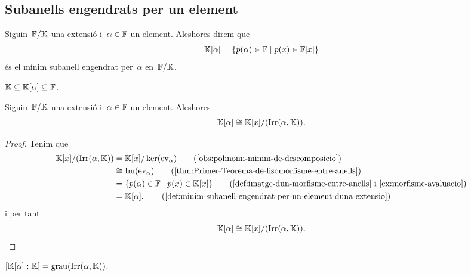 \documentclass[../teoria-de-Galois.tex]{subfiles}
\begin{document}
\subsection{Subanells engendrats per un element}
    \begin{definition}
        \label{def:minim-subanell-engendrat-per-un-element-duna-extensio}
        Siguin~\(\mathbb{F}/\mathbb{K}\) una extensió i~\(\alpha\in\mathbb{F}\) un element.
        Aleshores direm que
        \[
            \mathbb{K}[\alpha]=\{p(\alpha)\in\mathbb{F}\mid p(x)\in\mathbb{F}[x]\}
        \]
        és el mínim subanell engendrat per~\(\alpha\) en~\(\mathbb{F}/\mathbb{K}\).
    \end{definition}
    \begin{observation}
    \label{obs:lanell-engendrat-per-alpha-esta-entre-lextensio}
        \(\mathbb{K}\subseteq\mathbb{K}[\alpha]\subseteq\mathbb{F}\).
    \end{observation}
    \begin{proposition}
        \label{prop:el-minim-subanell-engendrat-per-un-element-es-lanell-de-polinomis-quocient-lirreductible-de-lelement}
        Siguin~\(\mathbb{F}/\mathbb{K}\) una extensió i~\(\alpha\in\mathbb{F}\) un element.
        Aleshores
        \[
            \mathbb{K}[\alpha]\cong\mathbb{K}[x]/(\operatorname{Irr}(\alpha,\mathbb{K})).
        \]
    \end{proposition}
    \begin{proof}
        Tenim que
        \begin{align*}
            \KK[x]/(\Irr(\alpha,\KK))&=\KK[x]/\ker(\ev_{\alpha}) \tag{\ref{obs:polinomi-minim-de-descomposicio}}\\
            &\cong\Ima(\ev_{\alpha}) \tag{\ref{thm:Primer-Teorema-de-lisomorfisme-entre-anells}}\\
            &=\{p(\alpha)\in\FF\mid p(x)\in\KK[x]\} \tag{\ref{def:imatge-dun-morfisme-entre-anells} i \ref{ex:morfisme-avaluacio}}\\
            &= \KK[\alpha], \tag{\ref{def:minim-subanell-engendrat-per-un-element-duna-extensio}}
        \end{align*}
        i per tant
        \[
            \mathbb{K}[\alpha]\cong\mathbb{K}[x]/(\operatorname{Irr}(\alpha,\mathbb{K})).\qedhere
        \]
    \end{proof}
    \begin{corollary}
        \label{cor:grau-dun-minim-subanell-engendrat-per-un-element-duna-extensio}
        \([\mathbb{K}[\alpha]:\mathbb{K}]=\operatorname{grau}(\operatorname{Irr}(\alpha,\mathbb{K}))\).
    \end{corollary}
\end{document}
